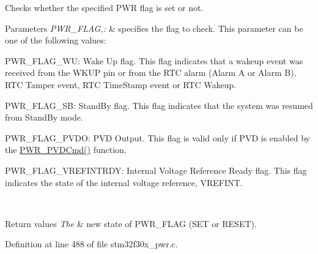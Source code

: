 Checks whether the specified P\-W\-R flag is set or not. 


\begin{DoxyParams}{Parameters}
{\em P\-W\-R\-\_\-\-F\-L\-A\-G,\-:} & specifies the flag to check. This parameter can be one of the following values\-: \begin{DoxyItemize}
\item P\-W\-R\-\_\-\-F\-L\-A\-G\-\_\-\-W\-U\-: Wake Up flag. This flag indicates that a wakeup event was received from the W\-K\-U\-P pin or from the R\-T\-C alarm (Alarm A or Alarm B), R\-T\-C Tamper event, R\-T\-C Time\-Stamp event or R\-T\-C Wakeup. \item P\-W\-R\-\_\-\-F\-L\-A\-G\-\_\-\-S\-B\-: Stand\-By flag. This flag indicates that the system was resumed from Stand\-By mode. \item P\-W\-R\-\_\-\-F\-L\-A\-G\-\_\-\-P\-V\-D\-O\-: P\-V\-D Output. This flag is valid only if P\-V\-D is enabled by the \hyperlink{group___p_w_r___private___functions_ga42cad476b816e0a33594a933b3ed1acd}{P\-W\-R\-\_\-\-P\-V\-D\-Cmd()} function. \item P\-W\-R\-\_\-\-F\-L\-A\-G\-\_\-\-V\-R\-E\-F\-I\-N\-T\-R\-D\-Y\-: Internal Voltage Reference Ready flag. This flag indicates the state of the internal voltage reference, V\-R\-E\-F\-I\-N\-T. \end{DoxyItemize}
\\
\hline
\end{DoxyParams}

\begin{DoxyRetVals}{Return values}
{\em The} & new state of P\-W\-R\-\_\-\-F\-L\-A\-G (S\-E\-T or R\-E\-S\-E\-T). \\
\hline
\end{DoxyRetVals}


Definition at line 488 of file stm32f30x\-\_\-pwr.\-c.

